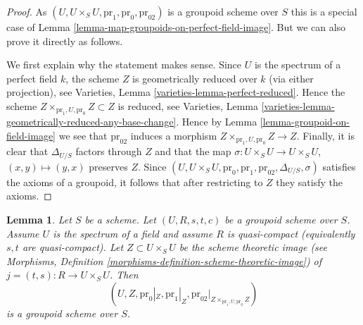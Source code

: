 \documentclass{stacks-project}
\theoremstyle{plain}
\newtheorem{lemma}[subsection]{Lemma}
\theoremstyle{definition}
\theoremstyle{remark}
\numberwithin{equation}{subsection}
\begin{document}
\begin{proof}
As $(U, U \times_S U, \text{pr}_1, \text{pr}_0, \text{pr}_{02})$
is a groupoid scheme over $S$ this is a special case of
Lemma \ref{lemma-map-groupoids-on-perfect-field-image}.
But we can also prove it directly as follows.

\medskip\noindent
We first explain why the statement makes sense. Since $U$ is the spectrum
of a perfect field $k$, the scheme $Z$ is geometrically reduced
over $k$ (via either projection), see
Varieties, Lemma \ref{varieties-lemma-perfect-reduced}.
Hence the scheme $Z \times_{\text{pr}_1, U, \text{pr}_0} Z \subset Z$
is reduced, see
Varieties, Lemma \ref{varieties-lemma-geometrically-reduced-any-base-change}.
Hence by
Lemma \ref{lemma-groupoid-on-field-image}
we see that $\text{pr}_{02}$ induces a morphism
$Z \times_{\text{pr}_1, U, \text{pr}_0} Z \to Z$.
Finally, it is clear that $\Delta_{U/S}$ factors through $Z$
and that the map
$\sigma : U \times_S U \to U \times_S U$, $(x, y) \mapsto (y, x)$
preserves $Z$. Since
$(U, U \times_S U, \text{pr}_0, \text{pr}_1, \text{pr}_{02},
\Delta_{U/S}, \sigma)$
satisfies the axioms of a groupoid, it follows that after restricting
to $Z$ they satisfy the axioms.
\end{proof}

\begin{lemma}
\label{lemma-quasi-compact-groupoid-on-field-image}
Let $S$ be a scheme. Let $(U, R, s, t, c)$ be a groupoid scheme
over $S$. Assume $U$ is the spectrum of a field and
assume $R$ is quasi-compact (equivalently $s, t$ are quasi-compact).
Let $Z \subset U \times_S U$ be the scheme theoretic image (see
Morphisms, Definition \ref{morphisms-definition-scheme-theoretic-image})
of $j = (t, s) : R \to U \times_S U$.
Then
$$
(U, Z, \text{pr}_0|_Z, \text{pr}_1|_Z,
\text{pr}_{02}|_{Z \times_{\text{pr}_1, U, \text{pr}_0} Z})
$$
is a groupoid scheme over $S$.
\end{lemma}
\end{document}
